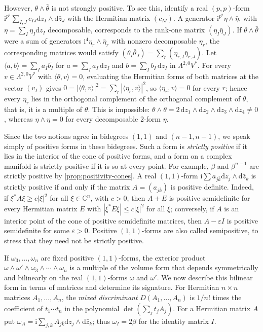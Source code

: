 However, $\theta\wedge\bar\theta$ is not strongly positive. To see this, identify a real $(p,p)$-form $\mathrm i^{p^2}\sum_{I,J}c_{IJ}\mathrm dz_I\wedge\mathrm d\bar z_J$ with the Hermitian matrix $(c_{IJ})$. A generator $\mathrm i^{p^2}\eta\wedge\bar\eta$, with $\eta=\sum_I\eta_I\mathrm dz_I$ decomposable, corresponds to the rank-one matrix $(\eta_I\bar\eta_J)$. If $\theta\wedge\bar\theta$ were a sum of generators $\mathrm i^4\eta_r\wedge\bar\eta_r$ with nonzero decomposable $\eta_r$, the corresponding matrices would satisfy $(\theta_I\bar\theta_J)=\sum_r(\eta_{r,I}\bar\eta_{r,J})$. Let $\langle a,b\rangle=\sum_Ia_I\overline{b_I}$ for $a=\sum_Ia_I\,\mathrm dz_I$ and $b=\sum_Ib_I\,\mathrm dz_I$ in $\Lambda^{2,0}V^*$. For every $v\in\Lambda^{2,0}V^*$ with $\langle\theta,v\rangle=0$, evaluating the Hermitian forms of both matrices at the vector $(v_I)$ gives $0=|\langle\theta,v\rangle|^2=\sum_r|\langle\eta_r,v\rangle|^2$, so $\langle\eta_r,v\rangle=0$ for every $r$; hence every $\eta_r$ lies in the orthogonal complement of the orthogonal complement of $\theta$, that is, it is a multiple of $\theta$. This is impossible: $\theta\wedge\theta=2\,\mathrm dz_1\wedge\mathrm dz_2\wedge\mathrm dz_3\wedge\mathrm dz_4\ne0$, whereas $\eta\wedge\eta=0$ for every decomposable $2$-form $\eta$.

Since the two notions agree in bidegrees $(1,1)$ and $(n-1,n-1)$, we speak simply of positive forms in these bidegrees. Such a form is \emph{strictly positive} if it lies in the interior of the cone of positive forms, and a form on a complex manifold is strictly positive if it is so at every point. For example, $\beta$ and $\beta^{n-1}$ are strictly positive by \cref{prop:positivity-cones}. A real $(1,1)$-form $\mathrm i\sum a_{j\bar k}\mathrm dz_j\wedge\mathrm d\bar z_k$ is strictly positive if and only if the matrix $A=(a_{j\bar k})$ is positive definite. Indeed, if $\xi^*A\xi\geq c|\xi|^2$ for all $\xi\in\mathbb C^n$, with $c>0$, then $A+E$ is positive semidefinite for every Hermitian matrix $E$ with $|\xi^*E\xi|\leq c|\xi|^2$ for all $\xi$; conversely, if $A$ is an interior point of the cone of positive semidefinite matrices, then $A-\varepsilon I$ is positive semidefinite for some $\varepsilon>0$. Positive $(1,1)$-forms are also called semipositive, to stress that they need not be strictly positive.

If $\omega_3,\ldots,\omega_n$ are fixed positive $(1,1)$-forms, the exterior product $\omega\wedge\omega'\wedge\omega_3\wedge\cdots\wedge\omega_n$ is a multiple of the volume form that depends symmetrically and bilinearly on the real $(1,1)$-forms $\omega$ and $\omega'$. We now describe this bilinear form in terms of matrices and determine its signature. For Hermitian $n\times n$ matrices $A_1,\ldots,A_n$, the \emph{mixed discriminant} $D(A_1,\ldots,A_n)$ is $1/n!$ times the coefficient of $t_1\cdots t_n$ in the polynomial $\det(\sum_jt_jA_j)$. For a Hermitian matrix $A$ put $\omega_A=\mathrm{i}\sum_{j,k}A_{j\bar k}\mathrm{d}z_j\wedge\mathrm{d}\bar z_k$; thus $\omega_I=2\beta$ for the identity matrix $I$.

